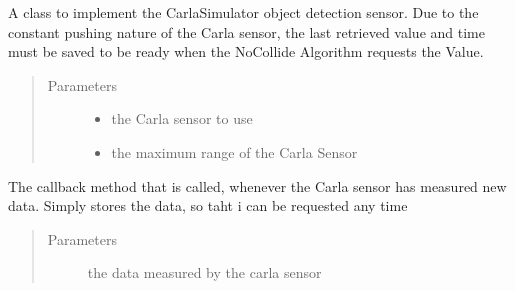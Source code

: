 \documentclass[letterpaper,10pt,english]{sphinxmanual}
\begin{document}

\begin{fulllineitems}
\label{\detokenize{sim_interfaces:lib.sim_interfaces.SimSensor}}
A class to implement the Carla\sphinxhyphen{}Simulator object detection sensor. Due to the constant pushing nature of the Carla sensor,
the last retrieved value and time must be saved to be ready when the NoCollide Algorithm requests the Value.
\begin{quote}\begin{description}
\item[{Parameters}] \leavevmode\begin{itemize}
\item {} 
 \textendash{} the Carla sensor to use

\item {} 
 \textendash{} the maximum range of the Carla Sensor

\end{itemize}

\end{description}\end{quote}

\begin{fulllineitems}
\label{\detokenize{sim_interfaces:lib.sim_interfaces.SimSensor.callback}}
The callback method that is called, whenever the Carla sensor has measured new data. Simply stores the data,
so taht i can be requested any time
\begin{quote}\begin{description}
\item[{Parameters}] \leavevmode
{} \textendash{} the data measured by the carla sensor

\end{description}\end{quote}


\end{fulllineitems}
\end{fulllineitems}
\end{document}
